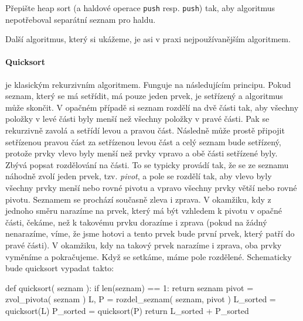 \begin{cviceni} Přepište heap sort (a haldové operace {\tt push} resp. {\tt push}) tak, aby algoritmus nepotřeboval separátní seznam pro haldu.
\end{cviceni}

Další algoritmus, který si ukážeme, je asi v praxi nejpoužívanějším algoritmem.

\paragraph{Quicksort} je klasickým rekurzivním algoritmem. Funguje na
následujícím principu. Pokud seznam, který se má setřídit, má pouze jeden prvek, je setřízený a algoritmus
může skončit. V opačném případě si seznam rozdělí na dvě části tak, aby všechny položky v levé části byly
menší než všechny položky v pravé části. Pak se rekurzivně zavolá a setřídí
levou a pravou část. Následně může prostě připojit setřízenou pravou část za setřízenou levou část
a celý seznam bude setřízený, protože prvky vlevo byly menší než prvky vpravo a obě části setřízené
byly. Zbývá popsat rozdělování na části. To se typicky provádí tak, že se ze seznamu náhodně zvolí jeden
prvek, tzv. \emph{pivot}, a pole se rozdělí tak, aby vlevo byly všechny prvky menší nebo rovné pivotu
a vpravo všechny prvky větší nebo rovné pivotu. Seznamem se prochází současně zleva i zprava. V okamžiku, kdy z
jednoho směru narazíme na prvek, který má být vzhledem k pivotu v opačné části, čekáme, než k takovému
prvku dorazíme i zprava (pokud na žádný nenarazíme, víme, že jsme hotovi a tento prvek bude první prvek,
který patří do pravé části). V okamžiku, kdy na takový prvek narazíme i zprava, oba prvky vyměníme
a pokračujeme. Když se setkáme, máme pole rozdělené. Schematicky bude quicksort vypadat takto:

\begin{python}
def quicksort( seznam ):
    if len(seznam) == 1:
      return seznam
    pivot = zvol_pivota( seznam )
    L, P = rozdel_seznam( seznam, pivot )
    L_sorted = quicksort(L)
    P_sorted = quicksort(P)
    return L_sorted + P_sorted
\end{python}

